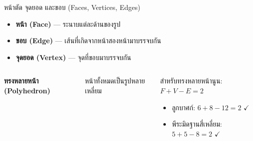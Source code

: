 \documentclass[11pt, aspectratio=169]{beamer}
\begin{document}
\begin{frame}{หน้าตัด จุดยอด และขอบ (Faces, Vertices, Edges)}
  \begin{explanation}
    \begin{itemize}
      \item \textbf{หน้า (Face)} — ระนาบแต่ละด้านของรูป
      \item \textbf{ขอบ (Edge)} — เส้นที่เกิดจากหน้าสองหน้ามาบรรจบกัน
      \item \textbf{จุดยอด (Vertex)} — จุดที่ขอบมาบรรจบกัน
    \end{itemize}
  \end{explanation}

  \begin{columns}[T]
      \centering

      \textbf{ทรงหลายหน้า (Polyhedron)}

      หน้าทั้งหมดเป็นรูปหลายเหลี่ยม

      \begin{exambox}
        สำหรับทรงหลายหน้านูน:
         $F + V - E = 2$
        \begin{itemize}
          \item ลูกบาศก์: $6 + 8 - 12 = 2$ \quad $\checkmark$
          \item พีระมิดฐานสี่เหลี่ยม: $5 + 5 - 8 = 2$ \quad $\checkmark$
        \end{itemize}
      \end{exambox}
  \end{columns}
\end{frame}
\end{document}
